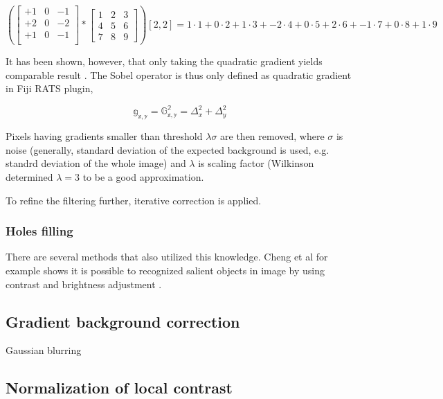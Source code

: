 \documentclass[pdftex,12pt,a4paper]{report}
\begin{document}
\[
\left( 
\begin{bmatrix}
+1 & 0 & -1 \\
+2 & 0 & -2 \\
+1 & 0 & -1 \\
\end{bmatrix}
*
\begin{bmatrix}
1 & 2 & 3 \\
4 & 5 & 6 \\
7 & 8 & 9
\end{bmatrix}
\right) [2,2]
= 1 \cdot 1 + 0 \cdot 2 + 1 \cdot 3 + -2 \cdot 4 + 0 \cdot 5 + 2 \cdot 6 + -1 \cdot 7 + 0 \cdot 8 + 1 \cdot 9
\]

It has been shown, however, that only taking the quadratic gradient yields comparable result \cite{wilkinson1998digital}. The Sobel operator is thus only defined as quadratic gradient in Fiji RATS plugin,

$$
\mathbb{g_{x, y}} = \mathbb{G_{x, y}^2} = \Delta_x^2 + \Delta_y^2
$$

Pixels having gradients smaller than threshold $\lambda \sigma$ are then removed, where $\sigma$ is noise (generally, standard deviation of the expected background is used, e.g. standrd deviation of the whole image) and $\lambda$ is scaling factor (Wilkinson determined $\lambda = 3$ to be a good approximation.

To refine the filtering further, iterative correction is applied. 

\subsubsection*{Holes filling}

There are several methods that also utilized this knowledge. Cheng et al for example shows it is possible to recognized salient objects in image by using contrast and brightness adjustment \cite{cheng2015global}.

\subsection{Gradient background correction}

\label{subsection:gradient_background_correction}

Gaussian blurring

\subsection{Normalization of local contrast}
\end{document}
